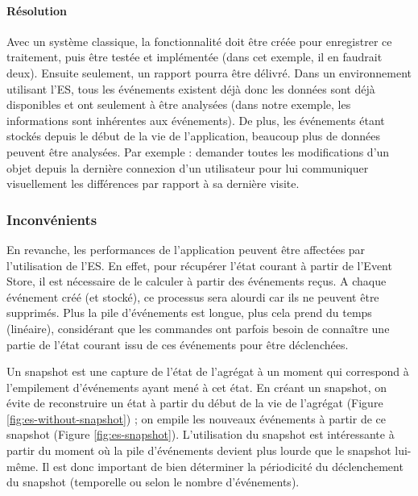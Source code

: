 \paragraph{Résolution} Avec un système classique, la fonctionnalité doit être 
créée pour enregistrer ce traitement, puis être testée et implémentée (dans cet 
exemple, il en faudrait deux). Ensuite seulement, un rapport pourra être délivré. 
Dans un environnement utilisant l'\gls{ES}, tous les événements existent déjà 
donc les données sont déjà disponibles et ont seulement à être analysées 
(dans 
notre exemple, les informations sont inhérentes aux événements). De plus, les 
événements étant stockés depuis le début de la vie de l'application, beaucoup plus de données peuvent être analysées. Par 
exemple : demander toutes les modifications d'un objet depuis la dernière 
connexion d'un utilisateur pour lui communiquer visuellement les différences par 
rapport à sa dernière visite.



\subsubsection{Inconvénients}
En revanche, les performances de l'application peuvent être affectées par 
l'utilisation de 
l'\gls{ES}. En effet, pour récupérer l'état courant à partir de l'Event Store, il est 
nécessaire de le calculer à partir des événements reçus.
A chaque événement créé (et stocké), ce processus sera alourdi car ils ne 
peuvent être supprimés. Plus la pile d'événements est longue, plus cela prend 
du temps (linéaire), considérant que les commandes ont parfois besoin de connaître une partie de 
 l'état courant issu de ces événements pour être déclenchées.
 
Un \gls{snapshot} est une capture de l'état de l'agrégat à un 
moment qui correspond à l'empilement d'événements ayant mené à cet état. En 
créant un \gls{snapshot}, on évite de reconstruire un état à partir du début de la 
vie de l'agrégat (Figure \ref{fig:es-without-snapshot}) ; on empile les nouveaux 
événements à partir de ce snapshot (Figure \ref{fig:es-snapshot}). 
L'utilisation du \gls{snapshot} est intéressante à partir du moment où la pile 
d'événements devient plus lourde que le \gls{snapshot} lui-même. Il est donc 
important de bien déterminer la périodicité du déclenchement du \gls{snapshot} 
(temporelle ou selon le nombre d'événements).

